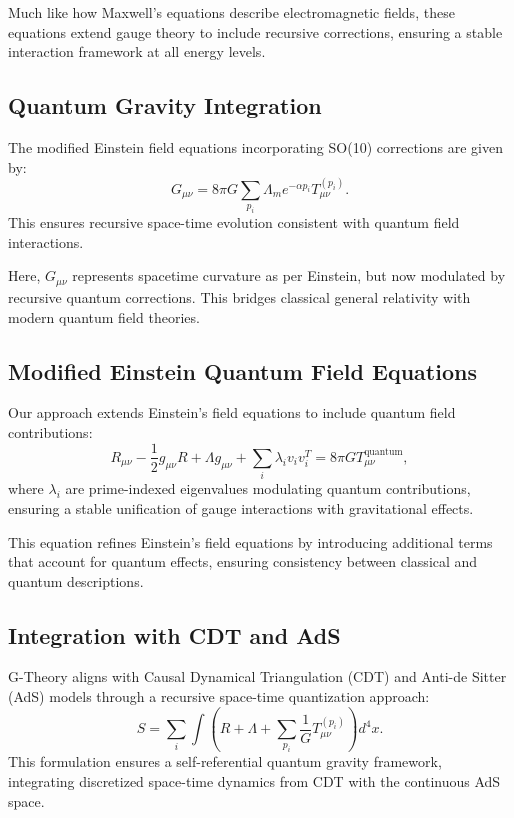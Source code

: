 \documentclass{article}
\theoremstyle{plain}
\begin{document}
Much like how Maxwell's equations describe electromagnetic fields, these equations extend gauge theory to include recursive corrections, ensuring a stable interaction framework at all energy levels.

\subsection{Quantum Gravity Integration}
The modified Einstein field equations incorporating SO(10) corrections are given by:
\begin{equation}
    G_{\mu\nu} = 8\pi G \sum_{p_i} \Lambda_m e^{-\alpha p_i} T_{\mu\nu}^{(p_i)}.
\end{equation}
This ensures recursive space-time evolution consistent with quantum field interactions.

Here, $G_{\mu\nu}$ represents spacetime curvature as per Einstein, but now modulated by recursive quantum corrections. This bridges classical general relativity with modern quantum field theories.

\subsection{Modified Einstein Quantum Field Equations}
Our approach extends Einstein’s field equations to include quantum field contributions:
\begin{equation}
    R_{\mu\nu} - \frac{1}{2} g_{\mu\nu} R + \Lambda g_{\mu\nu} + \sum_{i} \lambda_i v_i v_i^T = 8\pi G T_{\mu\nu}^{\text{quantum}},
\end{equation}
where $\lambda_i$ are prime-indexed eigenvalues modulating quantum contributions, ensuring a stable unification of gauge interactions with gravitational effects.

This equation refines Einstein's field equations by introducing additional terms that account for quantum effects, ensuring consistency between classical and quantum descriptions.

\subsection{Integration with CDT and AdS}
G-Theory aligns with Causal Dynamical Triangulation (CDT) and Anti-de Sitter (AdS) models through a recursive space-time quantization approach:
\begin{equation}
    S = \sum_{i} \int \left( R + \Lambda + \sum_{p_i} \frac{1}{G} T_{\mu\nu}^{(p_i)} \right) d^4x.
\end{equation}
This formulation ensures a self-referential quantum gravity framework, integrating discretized space-time dynamics from CDT with the continuous AdS space.
\end{document}
